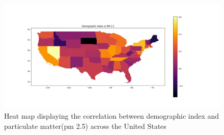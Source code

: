 \documentclass[letterpaper, 10 pt, conference]{ieeeconf}  %
\begin{document}
\begin{figure}
    \centering
    \includegraphics[width=1\linewidth]{Images/DemogrpahicIndex.VS.PM-2.5.png}
    \caption{Heat map displaying the correlation between demographic index and particulate matter(pm 2.5) across the United States}
    \label{fig:enter-label}
\end{figure}
\end{document}
